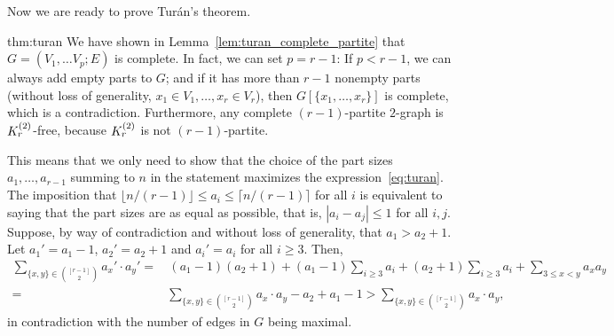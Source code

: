 Now we are ready to prove Turán's theorem.
\begin{delayedproof}{thm:turan}
    We have shown in Lemma~\ref{lem:turan_complete_partite} that $G = (V_1, \dots V_p; E)$ is complete.
    In fact, we can set $p = r - 1$:
    If $p < r - 1$, we can always add empty parts to $G$; and if it has more than $r - 1$ nonempty parts
    (without loss of generality, $x_1 \in V_1, \dots, x_r \in V_r$), then $G[\{x_1, \dots, x_r\}]$ is complete,
    which is a contradiction.
    Furthermore, any complete $(r-1)$-partite $2$-graph is $K^{(2)}_{r}$-free,
    because $K^{(2)}_{r}$ is not $(r-1)$-partite.

    This means that we only need to show that the choice of the part sizes $a_1, \dots, a_{r-1}$ summing to $n$
    in the statement maximizes the expression~\eqref{eq:turan}.
    The imposition that $\lfloor n / (r-1) \rfloor \leq a_i \leq \lceil n / (r-1) \rceil$ for all $i$
    is equivalent to saying that the part sizes are as equal as possible, that is,
    $|a_i - a_j| \leq 1$ for all $i, j$.
    Suppose, by way of contradiction and without loss of generality, that $a_1 > a_2 + 1$.
    Let $a_1' = a_1 - 1$, $a_2' = a_2 + 1$ and $a_i' = a_i$ for all $i \geq 3$.
    Then,
    \begin{align*}
        \sum_{\{x, y\} \in \binom{[r-1]}{2}} a_x' \cdot a_y'
        =& \, (a_1 - 1)(a_2 + 1) + (a_1 - 1) \sum_{i \geq 3} a_i + (a_2 + 1) \sum_{i \geq 3} a_i + \sum_{3 \leq x < y} a_x a_y \\
        =& \sum_{\{x, y\} \in \binom{[r-1]}{2}} a_x \cdot a_y - a_2 + a_1 - 1
        > \sum_{\{x, y\} \in \binom{[r-1]}{2}} a_x \cdot a_y,
    \end{align*}
    in contradiction with the number of edges in $G$ being maximal.
\end{delayedproof}

